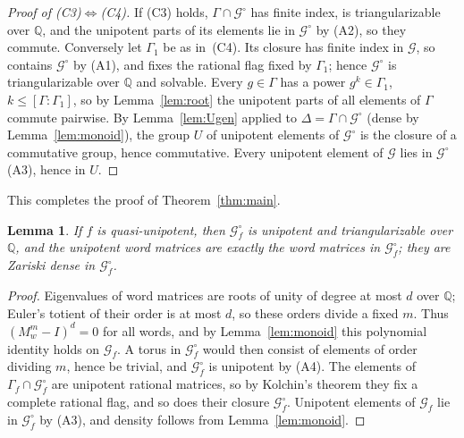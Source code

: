 \documentclass[11pt,letterpaper]{article}
\newcommand{\Q}{\mathbb{Q}}
\newcommand{\cG}{\mathcal{G}}
\newtheorem{lemma}[theorem]{Lemma}
\theoremstyle{definition}
\begin{document}
\begin{proof}[Proof of (C3)$\Leftrightarrow$(C4)]
If (C3) holds, $\Gamma\cap\cG^\circ$ has finite index, is triangularizable over $\Q$, and the unipotent parts of its elements lie in $\cG^\circ$ by (A2), so they commute. Conversely let $\Gamma_1$ be as in~(C4). Its closure has finite index in $\cG$, so contains $\cG^\circ$ by (A1), and fixes the rational flag fixed by $\Gamma_1$; hence $\cG^\circ$ is triangularizable over $\Q$ and solvable. Every $g\in\Gamma$ has a power $g^k\in\Gamma_1$, $k\le[\Gamma:\Gamma_1]$, so by Lemma~\ref{lem:root} the unipotent parts of all elements of $\Gamma$ commute pairwise. By Lemma~\ref{lem:Ugen} applied to $\Delta=\Gamma\cap\cG^\circ$ (dense by Lemma~\ref{lem:monoid}), the group $U$ of unipotent elements of $\cG^\circ$ is the closure of a commutative group, hence commutative. Every unipotent element of $\cG$ lies in $\cG^\circ$ (A3), hence in $U$.
\end{proof}

This completes the proof of Theorem~\ref{thm:main}.

\begin{lemma}\label{lem:qu}
If $f$ is quasi-unipotent, then $\cG_f^\circ$ is unipotent and triangularizable over $\Q$, and the unipotent word matrices are exactly the word matrices in $\cG_f^\circ$; they are Zariski dense in $\cG_f^\circ$.
\end{lemma}
\begin{proof}
Eigenvalues of word matrices are roots of unity of degree at most $d$ over $\Q$; Euler's totient of their order is at most $d$, so these orders divide a fixed $m$. Thus $(M_w^m-I)^d=0$ for all words, and by Lemma~\ref{lem:monoid} this polynomial identity holds on $\cG_f$. A torus in $\cG_f^\circ$ would then consist of elements of order dividing $m$, hence be trivial, and $\cG_f^\circ$ is unipotent by (A4). The elements of $\Gamma_f\cap\cG_f^\circ$ are unipotent rational matrices, so by Kolchin's theorem they fix a complete rational flag, and so does their closure $\cG_f^\circ$. Unipotent elements of $\cG_f$ lie in $\cG_f^\circ$ by (A3), and density follows from Lemma~\ref{lem:monoid}.
\end{proof}
\end{document}
